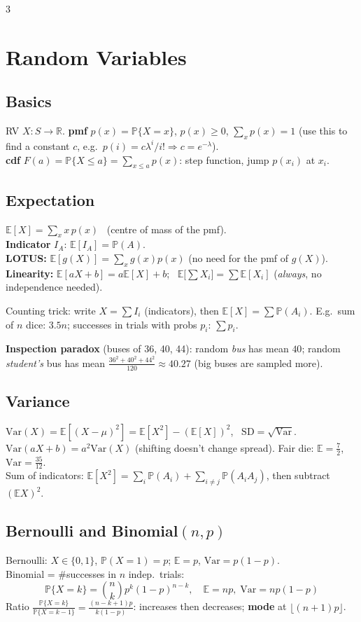 \documentclass[8pt]{extarticle}
\newcommand{\PP}{\mathbb{P}}
\newcommand{\E}{\mathbb{E}}
\newcommand{\Var}{\mathrm{Var}}
\begin{document}
\begin{multicols*}{3}
\section{Random Variables}
\subsection{Basics}
RV $X:S\to\mathbb R$. \textbf{pmf} $p(x)=\PP\{X=x\}$, $p(x)\ge0$, $\sum_x p(x)=1$ (use this to find a constant $c$, e.g.\ $p(i)=c\lambda^i/i!\Rightarrow c=e^{-\lambda}$).\\
\textbf{cdf} $F(a)=\PP\{X\le a\}=\sum_{x\le a}p(x)$: step function, jump $p(x_i)$ at $x_i$.

\subsection{Expectation}
$\E[X]=\sum_x x\,p(x)$ \ (centre of mass of the pmf).\\
\textbf{Indicator} $I_A$: $\E[I_A]=\PP(A)$.\\
\textbf{LOTUS:} $\E[g(X)]=\sum_x g(x)p(x)$ (no need for the pmf of $g(X)$).\\
\textbf{Linearity:} $\E[aX+b]=a\E[X]+b$; \ $\E\big[\sum X_i\big]=\sum\E[X_i]$ (\emph{always}, no independence needed).
\begin{idea}Counting trick: write $X=\sum I_i$ (indicators), then $\E[X]=\sum\PP(A_i)$. E.g.\ sum of $n$ dice: $3.5n$; successes in trials with probs $p_i$: $\sum p_i$.\end{idea}
\textbf{Inspection paradox} (buses of 36, 40, 44): random \emph{bus} has mean $40$; random \emph{student's} bus has mean $\frac{36^2+40^2+44^2}{120}\approx40.27$ (big buses are sampled more).

\subsection{Variance}
$\Var(X)=\E[(X-\mu)^2]=\E[X^2]-(\E[X])^2$, \ $\mathrm{SD}=\sqrt{\Var}$.\\
$\Var(aX+b)=a^2\Var(X)$ (shifting doesn't change spread). Fair die: $\E=\frac72$, $\Var=\frac{35}{12}$.\\
Sum of indicators: $\E[X^2]=\sum_i\PP(A_i)+\sum_{i\ne j}\PP(A_iA_j)$, then subtract $(\E X)^2$.

\subsection{Bernoulli and Binomial$(n,p)$}
Bernoulli: $X\in\{0,1\}$, $\PP(X=1)=p$; $\E=p$, $\Var=p(1-p)$.\\
Binomial = \#successes in $n$ indep.\ trials:
\[\PP\{X=k\}=\binom nk p^k(1-p)^{n-k},\quad \E=np,\;\Var=np(1-p)\]
Ratio $\frac{\PP\{X=k\}}{\PP\{X=k-1\}}=\frac{(n-k+1)p}{k(1-p)}$: increases then decreases; \textbf{mode} at $\lfloor(n+1)p\rfloor$.


\end{multicols*}
\end{document}
